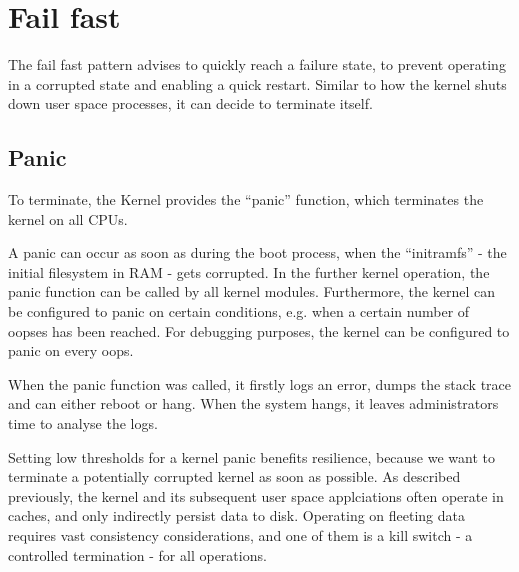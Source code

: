 \chapter{Fail fast}
The fail fast pattern advises to quickly reach a failure state, to prevent operating in a corrupted state and enabling a quick restart. \cite{shore2004fail}
Similar to how the kernel shuts down user space processes, it can decide to terminate itself.

\section{Panic}
To terminate, the Kernel provides the \enquote{panic} function, which terminates the kernel on all CPUs. \cite{panic}

A panic can occur as soon as during the boot process, when the \enquote{initramfs} - the initial filesystem in RAM - gets corrupted. In the further kernel operation, the panic function can be called by all kernel modules. 
Furthermore, the kernel can be configured to panic on certain conditions, e.g. when a certain number of oopses has been reached. For debugging purposes, the kernel can be configured to panic on every oops.

When the panic function was called, it firstly logs an error, dumps the stack trace and can either reboot or hang.
When the system hangs, it leaves administrators time to analyse the logs. 

Setting low thresholds for a kernel panic benefits resilience, because we want to terminate a potentially corrupted kernel as soon as possible.
As described previously, the kernel and its subsequent user space applciations often operate in caches, and only indirectly persist data to disk. Operating on fleeting data requires vast consistency considerations, and one of them is a kill switch - a controlled termination - for all operations.


